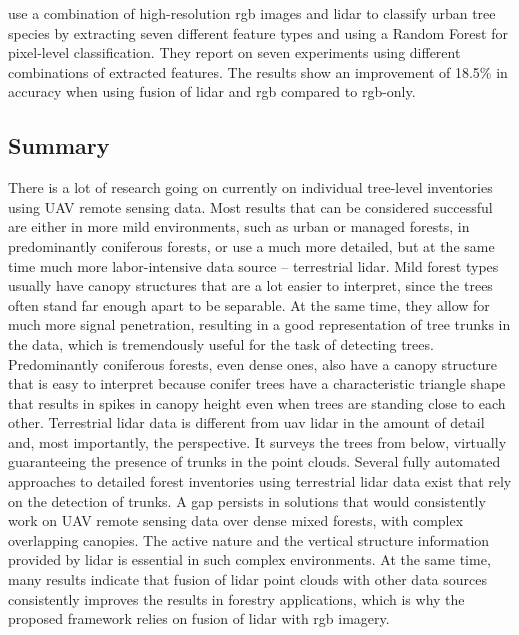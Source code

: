 \citet{wuFineClassificationUrban2024} use a combination of high-resolution \gls{rgb} images and \gls{lidar} to classify urban tree species by extracting seven different feature types and using a Random Forest for pixel-level classification.
They report on seven experiments using different combinations of extracted features.
The results show an improvement of 18.5\% in accuracy when using fusion of \gls{lidar} and \gls{rgb} compared to \gls{rgb}-only.


\subsection{Summary}

There is a lot of research going on currently on individual tree-level inventories using UAV remote sensing data.
Most results that can be considered successful are either in more mild environments, such as urban or managed forests, in predominantly coniferous forests, or use a much more detailed, but at the same time much more labor-intensive data source – terrestrial \gls{lidar}.
Mild forest types usually have canopy structures that are a lot easier to interpret, since the trees often stand far enough apart to be separable.
At the same time, they allow for much more signal penetration, resulting in a good representation of tree trunks in the data, which is tremendously useful for the task of detecting trees.
Predominantly coniferous forests, even dense ones, also have a canopy structure that is easy to interpret because conifer trees have a characteristic triangle shape that results in spikes in canopy height even when trees are standing close to each other.
Terrestrial \gls{lidar} data is different from \gls{uav} \gls{lidar} in the amount of detail and, most importantly, the perspective.
It surveys the trees from below, virtually guaranteeing the presence of trunks in the point clouds.
Several fully automated approaches to detailed forest inventories using terrestrial \gls{lidar} data exist that rely on the detection of trunks.
A gap persists in solutions that would consistently work on UAV remote sensing data over dense mixed forests, with complex overlapping canopies.
The active nature and the vertical structure information provided by \gls{lidar} is essential in such complex environments.
At the same time, many results indicate that fusion of \gls{lidar} point clouds with other data sources consistently improves the results in forestry applications, which is why the proposed framework relies on fusion of \gls{lidar} with \gls{rgb} imagery.
